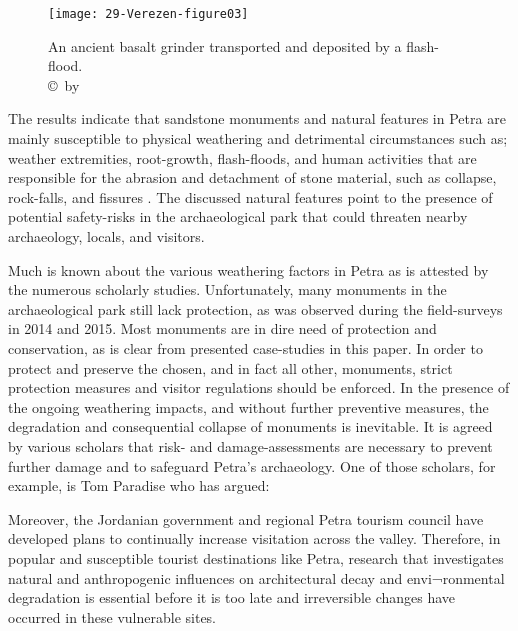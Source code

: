 \begin{figure}[!htb]
	\texttt{[image: 29-Verezen-figure03]}
	\caption{An ancient basalt grinder transported and deposited by a flash-flood.
		{\normalfont\scriptsize \\ \copyright\ by \shortauthor
	}}
	\label{fig:29-Verezen-figure03}
\end{figure}

The  results indicate that sandstone monuments and natural features in Petra are mainly susceptible to
physical weathering and detrimental circumstances such as; weather extremities, root-growth, flash-floods,
and human activities that are responsible for the abrasion and detachment of stone material, such as collapse, rock-falls, and
fissures  \parencites[267--284]{balaawi2011}[653]{heinrichs2008}[230]{turkington2005}.
The discussed natural features point to the presence of potential safety-risks in the archaeological park that
could threaten nearby archaeology, locals, and visitors.

Much is known about the various weathering factors in Petra as is attested by the numerous scholarly studies.
Unfortunately, many monuments in the archaeological park still lack protection, as was observed during the field-surveys in 2014 and 2015.
Most monuments are in dire need of protection and conservation, as is clear from presented case-studies in this paper.
In order to protect and preserve the chosen, and in fact all other, monuments, strict protection measures and
visitor regulations should be enforced.
In the presence of the ongoing weathering impacts, and without further preventive measures, the degradation and
consequential collapse of monuments is inevitable.
It is agreed by various scholars that risk- and damage-assessments are necessary to prevent further damage and
to safeguard Petra’s archaeology. One of those scholars, for example, is Tom Paradise who has argued:
\begin{IJSRAquote}{\cite[75]{paradise2010}}
		Moreover, the Jordanian government and regional Petra tourism council have developed plans to continually increase visitation across the valley. Therefore, in popular and susceptible tourist destinations like Petra, research that investigates natural and anthropogenic influences on architectural decay and envi¬ronmental degradation is essential before it is too late and irreversible changes have occurred in these vulnerable sites.
\end{IJSRAquote}

